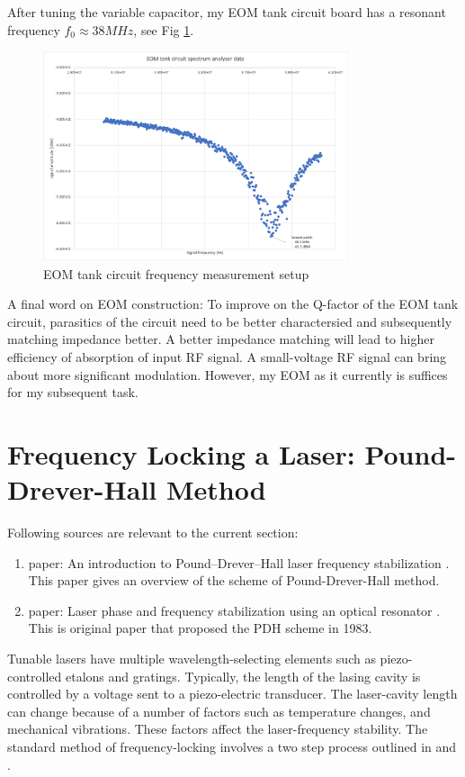 \documentclass[11pt,A4Paper]{article}
\begin{document}
After tuning the variable capacitor, my EOM tank circuit board has a resonant frequency $f_0 \approx 38 MHz$, see Fig \ref{fig:EOMfrequencyMeasurement}. 

\begin{figure}[H]
    \centering
    \includegraphics[width=0.8\textwidth]{EOMfrequencyMeasurement.png}
    \caption{EOM tank circuit frequency measurement setup}
    \label{fig:EOMfrequencyMeasurement}
\end{figure}

A final word on EOM construction: To improve on the Q-factor of the EOM tank circuit, parasitics of the circuit need to be better charactersied and subsequently matching impedance better. A better impedance matching will lead to higher efficiency of absorption of input RF signal. A small-voltage RF signal can bring about more significant modulation. However, my EOM as it currently is suffices for my subsequent task. 

\section{Frequency Locking a Laser: Pound-Drever-Hall Method}
Following sources are relevant to the current section: 
\begin{enumerate}
    \item paper: An introduction to Pound–Drever–Hall laser frequency stabilization \cite{PDHintro}. This paper gives an overview of the scheme of Pound-Drever-Hall method. 
    \item paper: Laser phase and frequency stabilization using an optical resonator \cite{PDH1983}. This is original paper that proposed the PDH scheme in 1983. 
\end{enumerate}

Tunable lasers have multiple wavelength-selecting elements such as piezo-controlled etalons and gratings. Typically, the length of the lasing cavity is controlled by a voltage sent to a piezo-electric transducer. The laser-cavity length can change because of a number of factors such as temperature changes, and mechanical vibrations. These factors affect the laser-frequency stability. The standard method of frequency-locking involves a two step process outlined in \cite{PDH1983} and \cite{PDHintro}. 
\par
\end{document}
